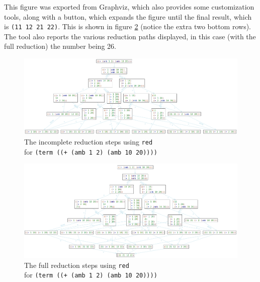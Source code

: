 This figure was exported from Graphviz, which also provides some customization
tools, along with a  button, which expands the figure until
the final result, which is \texttt{(11 12 21 22)}. This is shown in
figure \ref{fig:traces-amb-full} (notice the extra two bottom rows).
The tool also reports the various reduction paths displayed, in this case
(with the full reduction) the number being 26.

\newpage
\begin{landscape}
  \centering
  \begin{figure}[!h]
    \includegraphics[scale=0.4]{fig/traces-amb.png}
    \caption{The incomplete reduction steps using \texttt{red} \\
      for \texttt{(term ((+ (amb 1 2) (amb 10 20))))}}
    \label{fig:traces-amb}
  \end{figure}
\end{landscape}

\newpage
\begin{landscape}
  \centering
  \begin{figure}[!h]
    \includegraphics[scale=0.4]{fig/traces-amb-full.png}
    \caption{The full reduction steps using \texttt{red} \\
      for \texttt{(term ((+ (amb 1 2) (amb 10 20))))}}
    \label{fig:traces-amb-full}
  \end{figure}
\end{landscape}


